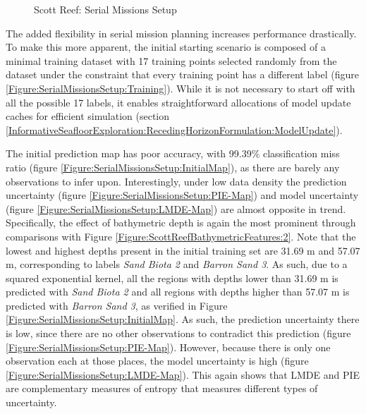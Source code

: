 			\begin{figure}[!htbp]
			\centering
			\caption{Scott Reef: Serial Missions Setup}
			\label{Figure:SerialMissionsSetup}
			\end{figure}
			
			The added flexibility in serial mission planning increases performance drastically. To make this more apparent, the initial starting scenario is composed of a minimal training dataset with 17 training points selected randomly from the dataset under the constraint that every training point has a different label (figure \ref{Figure:SerialMissionsSetup:Training}). While it is not necessary to start off with all the possible 17 labels, it enables straightforward allocations of model update caches for efficient simulation (section \ref{InformativeSeafloorExploration:RecedingHorizonFormulation:ModelUpdate}).
			
			The initial prediction map has poor accuracy, with 99.39\% classification miss ratio (figure \ref{Figure:SerialMissionsSetup:InitialMap}), as there are barely any observations to infer upon. Interestingly, under low data density the prediction uncertainty (figure \ref{Figure:SerialMissionsSetup:PIE-Map}) and model uncertainty (figure \ref{Figure:SerialMissionsSetup:LMDE-Map}) are almost opposite in trend. Specifically, the effect of bathymetric depth is again the most prominent through comparisons with Figure \ref{Figure:ScottReefBathymetricFeatures:2}. Note that the lowest and highest depths present in the initial training set are 31.69 m and 57.07 m, corresponding to labels \textit{Sand Biota 2} and \textit{Barron Sand 3}. As such, due to a squared exponential kernel, all the regions with depths lower than 31.69 m is predicted with \textit{Sand Biota 2} and all regions with depths higher than 57.07 m is predicted with \textit{Barron Sand 3}, as verified in Figure \ref{Figure:SerialMissionsSetup:InitialMap}. As such, the prediction uncertainty there is low, since there are no other observations to contradict this prediction (figure \ref{Figure:SerialMissionsSetup:PIE-Map}). However, because there is only one observation each at those places, the model uncertainty is high (figure \ref{Figure:SerialMissionsSetup:LMDE-Map}). This again shows that LMDE and PIE are complementary measures of entropy that measures different types of uncertainty.

